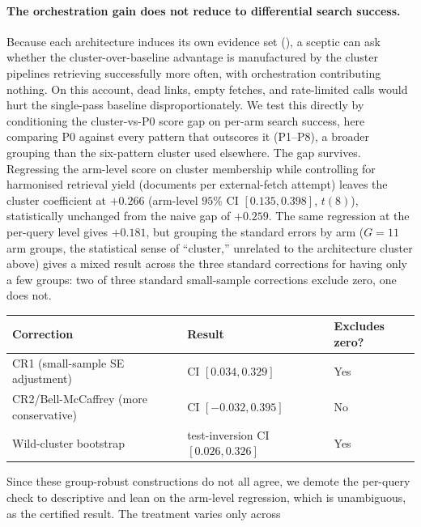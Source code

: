 \documentclass[11pt]{article}
\begin{document}
\paragraph{The orchestration gain does not reduce to differential search success.} Because each
architecture induces its own evidence set (), a sceptic can ask whether the
cluster-over-baseline advantage is manufactured by the cluster pipelines retrieving
successfully more often, with orchestration contributing nothing. On this account, dead links, empty
fetches, and rate-limited calls would hurt the single-pass baseline disproportionately. We test
this directly by conditioning the cluster-vs-P0 score gap on per-arm search success, here
comparing P0 against every pattern that outscores it (P1--P8), a broader grouping than the
six-pattern cluster used elsewhere. The gap
survives. Regressing the arm-level score on cluster membership while controlling for harmonised
retrieval yield (documents per external-fetch attempt) leaves the cluster coefficient at
$+0.266$ (arm-level $95\%$ CI $[0.135, 0.398]$, $t(8)$), statistically unchanged from the naive gap of $+0.259$.
The same regression at the per-query level gives $+0.181$, but grouping the standard errors
by arm ($G{=}11$ arm groups, the statistical sense of ``cluster,'' unrelated to the
architecture cluster above) gives a mixed result across the three standard corrections for
having only a few groups: two of three standard small-sample corrections exclude zero, one
does not.
\begin{center}
\begin{tabular}{lll}
\toprule
Correction & Result & Excludes zero? \\
\midrule
CR1 (small-sample SE adjustment) & CI $[0.034, 0.329]$ & Yes \\
CR2/Bell-McCaffrey (more conservative) & CI $[-0.032, 0.395]$ & No \\
Wild-cluster bootstrap\footnotemark & test-inversion CI $[0.026, 0.326]$ & Yes \\
\bottomrule
\end{tabular}
\end{center}
Since these
group-robust
constructions do not all agree, we demote the per-query check to descriptive and lean on
the arm-level regression, which is unambiguous, as the certified result. The
treatment varies only across
\end{document}
